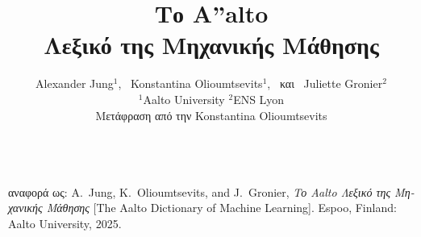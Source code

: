 \documentclass[journal,12pt,onecolumn]{article}
\begin{document}


\title {\vspace*{10mm}
	{\huge {\bf \foreignlanguage{greek}{Το} {\fontsize{40}{48}\selectfont \textbf{\textsf{A\hspace*{-2mm}''}}}\hspace*{-4mm}alto \\ \foreignlanguage{greek}{Λεξικό της Μηχανικής Μάθησης}}}  \\[-5mm] 
}


\author{\hspace{-2mm}Alexander Jung${}^{1}$, \ Konstantina Olioumtsevits${}^{1}$, \ \foreignlanguage{greek}{και} \ Juliette Gronier${}^{2}$ \\[-2mm]
	${}^{1}$Aalto University \quad ${}^{2}$ENS Lyon \\
\hspace{-2mm}\foreignlanguage{greek}{Μετάφραση από την} Konstantina Olioumtsevits \\[-2mm]
}

\maketitle
	\begin{center}
		\\[10mm]
{\large	\foreignlanguage{greek}{αναφορά ως}: A.\ Jung, K.\ Olioumtsevits, and J.\ Gronier, \textit{\foreignlanguage{greek}{Το} Aalto \foreignlanguage{greek}{Λεξικό της Μηχανικής Μάθησης}} [The Aalto Dictionary of Machine Learning]. Espoo, Finland: Aalto University, 2025.}
\end{center}

\newpage 
{}\
\end{document}
